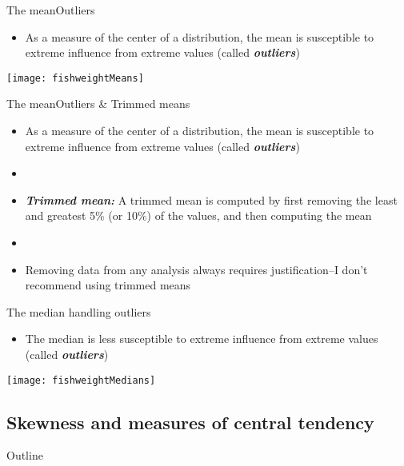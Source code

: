 \documentclass[xcolor=dvipsnames]{beamer}
\begin{document}
\begin{frame}{The mean}{Outliers}
\begin{itemize}
	\item As a measure of the center of a distribution, the mean is susceptible to extreme influence from extreme values (called \textbf{\emph{outliers}})
\end{itemize}
\begin{center}
	\texttt{[image: fishweightMeans]}
\end{center}
\end{frame}

\begin{frame}{The mean}{Outliers \& Trimmed means}
\begin{itemize}
	\item As a measure of the center of a distribution, the mean is susceptible to extreme influence from extreme values (called \textbf{\emph{outliers}})
	\item[]
	\item \textbf{\emph{Trimmed mean:}} A trimmed mean is computed by first removing the least and greatest 5\% (or 10\%) of the values, and then computing the mean
	\item[]
	\item Removing data from any analysis always requires justification--I don't recommend using trimmed means
\end{itemize}
\end{frame}

\begin{frame}{The median handling outliers}
\begin{itemize}
	\item The median is less susceptible to extreme influence from extreme values (called \textbf{\emph{outliers}})
\end{itemize}
\begin{center}
	\texttt{[image: fishweightMedians]}
\end{center}
\end{frame}

\subsection{Skewness and measures of central tendency}
\begin{frame}{Outline}
\tableofcontents[currentsection,subsectionstyle=show/shaded/hide]
\end{frame}
\end{document}
